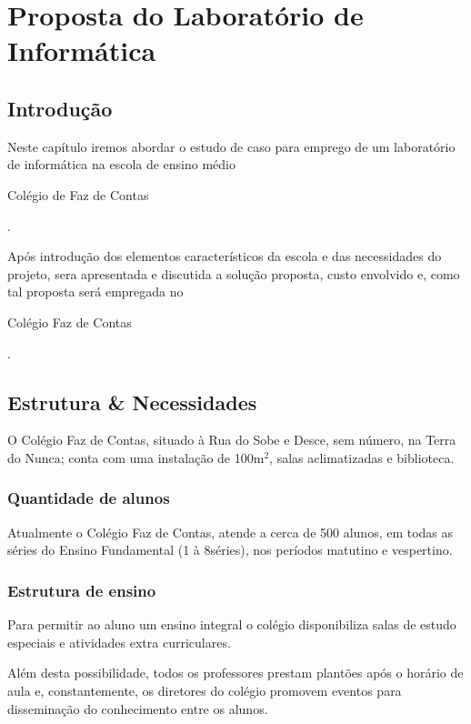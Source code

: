 \chapter[Laboratório]{Proposta do Laboratório de Informática}
\label{ch:laboratorio}

    \section{Introdução}
    \label{sc:laboratorio_intro}
    Neste capítulo iremos abordar o estudo de caso para emprego de um
    laboratório de informática na escola de ensino médio
    \begin{bfseries}Colégio de Faz de Contas\end{bfseries}.

    Após introdução dos elementos característicos da escola e das
    necessidades do projeto, sera apresentada e discutida a solução
    proposta, custo envolvido e, como tal proposta será empregada no
    \begin{bfseries}Colégio Faz de Contas\end{bfseries}.

    \section{Estrutura \& Necessidades}
    \label{sc:laboratorio_estrutura}
    O Colégio Faz de Contas, situado à Rua do Sobe e Desce, sem
    número, na Terra do Nunca; conta com uma instalação de
    100m\begin{math}^{2}\end{math}, salas aclimatizadas e biblioteca.

        \subsection{Quantidade de alunos}
        Atualmente o Colégio Faz de Contas, atende a cerca de 500
        alunos, em todas as séries do Ensino Fundamental (1\textordfeminine
        à 8\textordfeminine séries), nos períodos matutino e vespertino.

        \subsection{Estrutura de ensino}
        Para permitir ao aluno um ensino integral o colégio
        disponibiliza salas de estudo especiais e atividades extra
        curriculares.

        Além desta possibilidade, todos os professores prestam plantões
        após o horário de aula e, constantemente, os diretores do colégio
        promovem eventos para disseminação do conhecimento entre os
        alunos.

